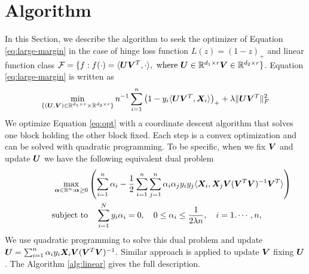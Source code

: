 \documentclass[12pt]{article}
\begin{document}
\section{Algorithm}
\label{sec:alg}
In this Section, we describe the algorithm to seek the optimizer of Equation  \eqref{eq:large-margin} in the case of hinge loss function $L(z) = (1-z)_+$ and linear function class $\mathcal{F} = \{f:f(\cdot)= \langle \bm{U}\bm{V}^T,\cdot\rangle, \text{ where }\bm{U}\in\mathbb{R}^{d_1\times r}\bm{V}\in\mathbb{R}^{d_2\times r}\}$.
Equation \eqref{eq:large-margin} is written as 
\begin{align}
\min_{\{(\bm{U},\bm{V})\in\mathbb{R}^{d_1\times r}\times \mathbb{R}^{d_2\times r}\}}n^{-1}\sum_{i=1}^n \left(1-y_i\langle \bm{U}\bm{V}^T,\bm X_i\rangle\right)_++\lambda \lVert\bm{U}\bm{V}^T\rVert_F^2
\end{align}
We optimize Equation \eqref{eq:opt} with a coordinate descent algorithm that solves one block holding the other block fixed.  Each step is a convex optimization and can be solved with quadratic programming.
To be specific, when we fix $\bm{V}$ and update $\bm{U}$ we have the following equivalent dual problem 
\begin{align}
 \hspace{1.5cm}\max_{\bm\alpha\in\mathbb{R}^n:\bm\alpha\geq0}& \left(\sum_{i=1}^n\alpha_i-\frac{1}{2}\sum_{i=1}^n\sum_{j=1}^n\alpha_i\alpha_jy_iy_j\langle \bm X_i,\bm X_j \bm{V}(\bm{V}^T\bm{V})^{-1}\bm{V}^T\rangle\right)\\
    \text{subject to}&\quad\sum_{i=1}^Ny_i\alpha_i = 0,\quad0\leq\alpha_i\leq\frac{1}{2\lambda n},\quad i=1.\cdots,n,
    \end{align}
   We use quadratic programming to solve this dual problem and update $\bm{U} = \sum_{i=1}^n\alpha_iy_i\bm X_i\bm{V}(\bm{V}^T\bm{V})^{-1}.$
Similar approach is applied to update $\bm{V}$ fixing $\bm{U}$.  The Algorithm \ref{alg:linear} gives the full description.
\end{document}
